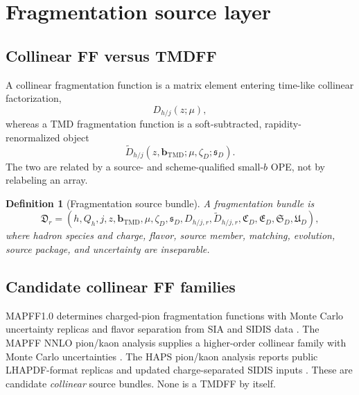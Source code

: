 \documentclass[11pt]{article}
\newtheorem{definition}{Definition}[section]
\newcommand{\bM}{\bm b_{\mathrm{TMD}}}
\begin{document}
\section{Fragmentation source layer}
\label{sec:fragmentation}

\subsection{Collinear FF versus TMDFF}

A collinear fragmentation function is a matrix element entering time-like collinear factorization,
\begin{equation}
 D_{h/j}(z;\mu),
 \label{eq:collinear-ff}
\end{equation}
whereas a TMD fragmentation function is a soft-subtracted, rapidity-renormalized object
\begin{equation}
 \widetilde D_{h/j}(z,\bM;\mu,\zeta_D;\mathfrak s_D).
 \label{eq:tmdff}
\end{equation}
The two are related by a source- and scheme-qualified small-\(b\) OPE, not by relabeling an array.

\begin{definition}[Fragmentation source bundle]
A fragmentation bundle is
\begin{equation}
 \mathfrak D_r
 =
 \left(
 h,Q_h,j,z,\bM,
 \mu,\zeta_D,
 \mathfrak s_D,
 D_{h/j,r},
 \widetilde D_{h/j,r},
 \mathfrak C_D,
 \mathfrak E_D,
 \mathfrak S_D,
 \mathfrak U_D
 \right),
 \label{eq:fragmentation-bundle}
\end{equation}
where hadron species and charge, flavor, source member, matching, evolution, source package, and uncertainty are inseparable.
\end{definition}

\subsection{Candidate collinear FF families}

MAPFF1.0 determines charged-pion fragmentation functions with Monte Carlo uncertainty replicas and flavor separation from SIA and SIDIS data \cite{MAPFF2021}.  The MAPFF NNLO pion/kaon analysis supplies a higher-order collinear family with Monte Carlo uncertainties \cite{MAPFF2022}.  The HAPS pion/kaon analysis reports public LHAPDF-format replicas and updated charge-separated SIDIS inputs \cite{HAPS2026}.  These are candidate \emph{collinear} source bundles.  None is a TMDFF by itself.
\end{document}

